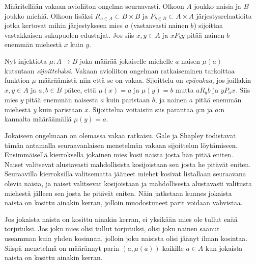 \documentclass[gradu]{tktltiki}
\begin{document}
\title{}
\author{Jani Rahkola}
\date{\today}
\level{}

\maketitle

\doublespacing

\subject{Tietojenkäsittelytiede}


Määritellään vakaan avioliiton ongelma seuraavasti. Olkoon \(A\)
joukko naisia ja \(B\) joukko miehiä. Olkoon lisäksi \(R_{a \in A}
\subset B \times B\) ja \(P_{b \in B} \subset A \times A\)
järjestysrelaatioita jotka kertovat mihin järjestykseen mies \(a\)
(vastaavasti nainen \(b\)) sijoittaa vastakkaisen sukupuolen
edustajat. Jos siis \(x,y \in A\) ja \(xP_by\) pitää nainen \(b\)
enemmän miehestä \(x\) kuin \(y\).

Nyt injektiota \(\mu : A \rightarrow B\) joka määrää jokaiselle
miehelle \(a\) naisen \(\mu(a)\) kutsutaan \emph{sijoitteluksi}.
Vakaan avioliiton ongelman ratkaiseminen tarkoittaa funktion \(\mu\)
määräämistä niin että se on vakaa. Sijoittelu on \emph{epävakaa}, jos
joillakin \(x, y \in A\) ja \(a, b \in B\) pätee, että \(\mu(x) = a\)
ja \(\mu(y) = b\) mutta \(aR_yb\) ja \(yP_ax\). Siis mies \(y\) pitää
enemmän naisesta \(a\) kuin paristaan \(b\), ja nainen \(a\) pitää
enemmän miehestä \(y\) kuin paristaan \(x\). Sijoittelua voitaisiin
siis parantaa \(y\):n ja \(a\):n kannalta määräämällä \(\mu(y) = a\).

Jokaiseen ongelmaan on olemassa vakaa ratkaisu. Gale ja Shapley
todistavat tämän antamalla seuraavanlaisen menetelmän vakaan
sijoittelun löytämiseen. Ensimmäisellä kierroksella jokainen mies
kosii naista josta hän pitää eniten. Naiset valitsevat alustavasti
mahdollisista kosijoistaan sen josta he pitävät eniten. Seuraavilla
kierroksilla valitsematta jääneet miehet kosivat listallaan seuraavana
olevia naisia, ja naiset valitsevat kosijoistaan ja mahdollisesta
alustavasti valitusta miehestä jälleen sen josta he pitävät eniten.
Näin jatketaan kunnes jokaista naista on kosittu ainakin kerran,
jolloin muodostuneet parit voidaan vahvistaa.

Jos jokaista naista on kosittu ainakin kerran, ei yksikään mies ole
tullut enää torjutuksi. Jos joku mies olisi tullut torjutuksi, olisi
joku nainen saanut useamman kuin yhden kosinnan, jolloin joku naisista
olisi jäänyt ilman kosintaa. Siispä menetelmä on määrännyt parin \((a,
\mu(a))\) kaikille \(a \in A\) kun jokaista naista on kosittu ainakin
kerran.
\end{document}
